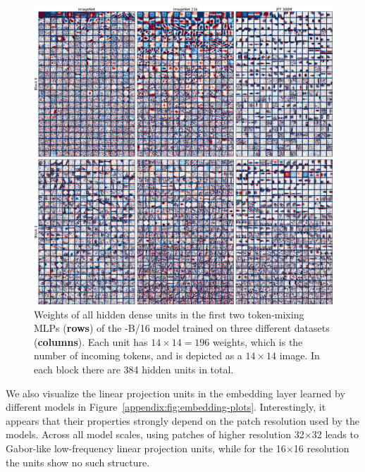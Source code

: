 \begin{figure}[t]
    \includegraphics[width=1.0\linewidth]{pics/weightvisualization_b16_full.pdf}
    \caption{Weights of all hidden dense units in the first two token-mixing MLPs ({\bf rows}) of the \name{}-B/16 model trained on three different datasets ({\bf columns}). 
    Each unit has $14 \times 14=196$ weights, which is the number of incoming tokens, and is depicted as a $14 \times 14$ image.
    In each block there are 384 hidden units in total.
    }
  \label{appendix:fig:weight-plots-full}
\end{figure}

We also visualize the linear projection units in the embedding layer learned by different models in Figure~\ref{appendix:fig:embedding-plots}. 
Interestingly, it appears that their properties strongly depend on the patch resolution used by the models.
Across all \name{} model scales, using patches of higher resolution 32$\times$32 leads to Gabor-like low-frequency linear projection units, while for the 16$\times$16 resolution the units show no such structure.

